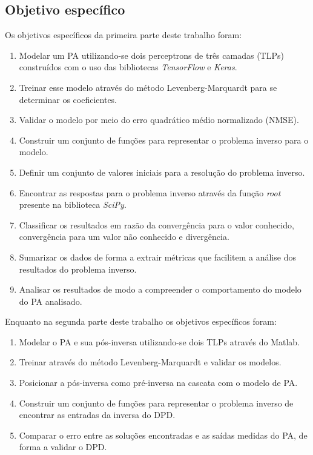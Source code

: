\subsection{Objetivo específico} \label{ssec:introd-obje-espec}
Os objetivos específicos da primeira parte deste trabalho foram:

\begin{enumerate}
    \item Modelar um PA utilizando-se dois perceptrons de três camadas (TLPs) construídos com o uso das bibliotecas \textit{TensorFlow} e \textit{Keras}.
    \item Treinar esse modelo através do método Levenberg-Marquardt para se determinar os coeficientes.
    \item Validar o modelo por meio do erro quadrático médio normalizado (NMSE).
    \item Construir um conjunto de funções para representar o problema inverso para o modelo.
    \item Definir um conjunto de valores iniciais para a resolução do problema inverso.
    \item Encontrar as respostas para o problema inverso através da função \textit{root} presente na biblioteca \textit{SciPy}.
    \item Classificar os resultados em razão da convergência para o valor conhecido, convergência para um valor não conhecido e divergência.
    \item Sumarizar os dados de forma a extrair métricas que facilitem a análise dos resultados do problema inverso.
    \item Analisar os resultados de modo a compreender o comportamento do modelo do PA analisado.
\end{enumerate}

Enquanto na segunda parte deste trabalho os objetivos específicos foram:

\begin{enumerate}
    \item Modelar o PA e sua pós-inversa utilizando-se dois TLPs através do Matlab.
    \item Treinar através do método Levenberg-Marquardt e validar os modelos.
    \item Posicionar a pós-inversa como pré-inversa na cascata com o modelo de PA.
    \item Construir um conjunto de funções para representar o problema inverso de encontrar as entradas da inversa do DPD.
    \item Comparar o erro entre as soluções encontradas e as saídas medidas do PA, de forma a validar o DPD.
\end{enumerate}

